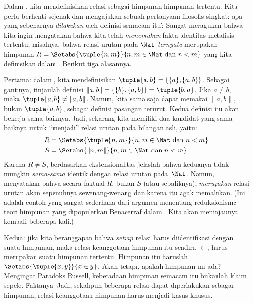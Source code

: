 \documentclass[../../../include/open-logic-section]{subfiles}
\begin{document}

Dalam , kita mendefinisikan relasi sebagai himpunan-himpunan
tertentu. Kita perlu berhenti sejenak dan mengajukan sebuah pertanyaan
filosofis singkat: apa yang sebenarnya \emph{dilakukan} oleh definisi semacam
itu? Sangat meragukan bahwa kita ingin mengatakan bahwa kita telah
\emph{menemukan} fakta identitas metafisis tertentu; misalnya, bahwa relasi
urutan pada $\Nat$ \emph{ternyata} merupakan himpunan $R=
\Setabs{\tuple{n,m}}{n, m \in \Nat\text{ dan } n < m}$ yang kita definisikan
dalam . Berikut tiga alasannya.

Pertama: dalam , kita mendefinisikan
$\tuple{a, b} = \{\{a\}, \{a, b\}\}$. Sebagai gantinya, tinjaulah definisi
$\lVert a, b\rVert = \{\{b\}, \{a, b\}\} = \tuple{b,a}$. Jika $a \neq b$,
maka $\tuple{a, b} \neq \lVert a,b\rVert$. Namun, kita sama saja dapat
memakai $\lVert a,b\rVert$, bukan $\tuple{a,b}$, sebagai definisi pasangan
terurut. Kedua definisi itu akan bekerja sama baiknya. Jadi, sekarang kita
memiliki dua kandidat yang sama baiknya untuk ``menjadi'' relasi urutan pada
bilangan asli, yaitu:
\begin{align*}
		R &= \Setabs{\tuple{n,m}}{n, m \in \Nat \text{ dan }n < m}\\
		S &= \Setabs{\lVert n,m\rVert}{n, m \in \Nat \text{ dan }n < m}.
\end{align*}
Karena $R \neq S$, berdasarkan ekstensionalitas jelaslah bahwa keduanya tidak
mungkin \emph{sama-sama} identik dengan relasi urutan pada~$\Nat$. Namun,
menyatakan bahwa secara faktual $R$, bukan $S$ (atau sebaliknya),
\emph{merupakan} relasi urutan akan sepenuhnya sewenang-wenang dan karena itu
agak memalukan. (Ini adalah contoh yang sangat sederhana dari argumen
menentang reduksionisme teori himpunan yang dipopulerkan Benacerraf dalam
\citeyear{Benacerraf1965}. Kita akan meninjaunya kembali beberapa kali.)

Kedua: jika kita beranggapan bahwa \emph{setiap} relasi harus diidentifikasi
dengan suatu himpunan, maka relasi keanggotaan himpunan itu sendiri, $\in$,
harus merupakan suatu himpunan tertentu. Himpunan itu haruslah
$\Setabs{\tuple{x,y}}{x \in y}$. Akan tetapi, apakah himpunan ini ada? Mengingat
Paradoks Russell, keberadaan himpunan semacam itu bukanlah klaim sepele.
Faktanya, 
Jadi, sekalipun beberapa relasi dapat diperlakukan sebagai himpunan, relasi
keanggotaan himpunan harus menjadi kasus khusus.
\end{document}
